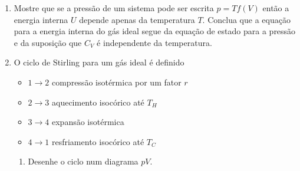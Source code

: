 \begin{enumerate}
    \item
        Mostre que se a pressão de um sistema pode ser escrita $p=Tf(V)$ então a
        energia interna $U$ depende apenas da temperatura $T$. Conclua que a
        equação para a energia interna do gás ideal segue da equação de estado
        para a pressão e da suposição que $C_V$ é independente da temperatura.

    \item
        O ciclo de Stirling para um gás ideal é definido 
        \begin{itemize}
            \item 
                $1\rightarrow2$ compressão isotérmica por um fator $r$
            \item
                $2\rightarrow3$ aquecimento isocórico até $T_H$
            \item
                $3\rightarrow4$ expansão isotérmica
            \item
                $4\rightarrow1$ resfriamento isocórico até $T_C$
        \end{itemize}
        \begin{enumerate}
            \item
                Desenhe o ciclo num diagrama $pV$.
\end{enumerate}
\end{enumerate}
